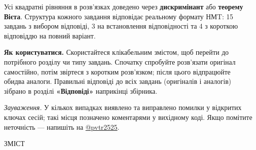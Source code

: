 \documentclass[12pt]{article}
\newcommand{\sectionTitle}[1]{%
\par\vspace{0.4cm}
\begin{tcolorbox}[colback=titleBg, colframe=titleBg, boxrule=0pt, arc=8pt,
    halign=center, fontupper=\Large\bfseries\color{mainGreen}]
#1
\end{tcolorbox}
\par\vspace{0.3cm}
}
\begin{document}
Усі квадратні рівняння в розв'язках доведено через \textbf{дискримінант} або \textbf{теорему Вієта}. Структура кожного завдання відповідає реальному формату НМT: 15 завдань з вибором відповіді, 3 на встановлення відповідності та 4 з короткою відповіддю на повний варіант.

\textbf{Як користуватися.} Скористайтеся клікабельним змістом, щоб перейти до потрібного розділу чи типу завдань. Спочатку спробуйте розв'язати оригінал самостійно, потім звіртеся з коротким розв'язком; після цього відпрацюйте обидва аналоги. Правильні відповіді до всіх завдань (оригіналів і аналогів) зібрано в розділі \textbf{«Відповіді»} наприкінці збірника.

\textit{Зауваження.} У кількох випадках виявлено та виправлено помилки у відкритих ключах сесій; такі місця позначено коментарями у вихідному коді. Якщо помітите неточність --- напишіть на \href{https://t.me/pvtr2525}{@pvtr2525}.

\clearpage
{}
\sectionTitle{ЗМІСТ}
{\hypersetup{linkcolor=black}\renewcommand{\contentsname}{}\vspace{-1cm}\tableofcontents}
\end{document}
